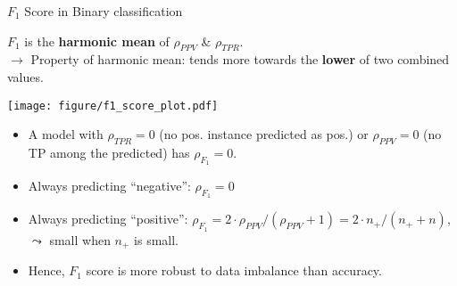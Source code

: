 \documentclass[11pt,compress,t,notes=noshow, xcolor=table]{beamer}
\newcommand{\np}{n_{+}} %
\begin{document}
\begin{vbframe}{$F_1$ Score in Binary classification}
	\footnotesize{
	
    	\begin{minipage}[c]{0.5\textwidth}
    		$F_1$ is the \textbf{harmonic mean} of $\rho_{PPV}$ \& $\rho_{TPR}$. \\
    		$\rightarrow$ Property of harmonic mean: tends more towards the \textbf{lower} of two combined values.
    	\end{minipage}%
    	\begin{minipage}[c]{0.5\textwidth}
    		\centering
    		\texttt{[image: figure/f1\_score\_plot.pdf]}
    	\end{minipage}
	
    	\begin{itemize}
    		\item A model with $\rho_{TPR} = 0$ (no pos. instance predicted as 
    		pos.) or 
    		$\rho_{PPV} = 0$ (no TP among the predicted) has $\rho_{F_1} = 0$.
      
    		\item Always predicting \enquote{negative}: $\rho_{F_1} = 0$
      
    		\item Always predicting \enquote{positive}: $\rho_{F_1} = 2 \cdot \rho_{PPV} / 
    		(\rho_{PPV} + 1) = 2 \cdot \np / (\np + n)$,\\ 
    		$\leadsto$ small when $\np$ is small.
    
            \item Hence, $F_1$ score is more robust to data imbalance than accuracy.
      
    	\end{itemize}
	}
\end{vbframe}
\end{document}
